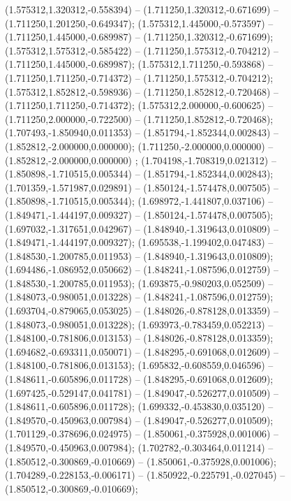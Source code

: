  (1.575312,1.320312,-0.558394) -- (1.711250,1.320312,-0.671699) -- (1.711250,1.201250,-0.649347);
 (1.575312,1.445000,-0.573597) -- (1.711250,1.445000,-0.689987) -- (1.711250,1.320312,-0.671699);
 (1.575312,1.575312,-0.585422) -- (1.711250,1.575312,-0.704212) -- (1.711250,1.445000,-0.689987);
 (1.575312,1.711250,-0.593868) -- (1.711250,1.711250,-0.714372) -- (1.711250,1.575312,-0.704212);
 (1.575312,1.852812,-0.598936) -- (1.711250,1.852812,-0.720468) -- (1.711250,1.711250,-0.714372);
 (1.575312,2.000000,-0.600625) -- (1.711250,2.000000,-0.722500) -- (1.711250,1.852812,-0.720468);
 (1.707493,-1.850940,0.011353) -- (1.851794,-1.852344,0.002843) -- (1.852812,-2.000000,0.000000);
 (1.711250,-2.000000,0.000000) -- (1.852812,-2.000000,0.000000) ;
 (1.704198,-1.708319,0.021312) -- (1.850898,-1.710515,0.005344) -- (1.851794,-1.852344,0.002843);
 (1.701359,-1.571987,0.029891) -- (1.850124,-1.574478,0.007505) -- (1.850898,-1.710515,0.005344);
 (1.698972,-1.441807,0.037106) -- (1.849471,-1.444197,0.009327) -- (1.850124,-1.574478,0.007505);
 (1.697032,-1.317651,0.042967) -- (1.848940,-1.319643,0.010809) -- (1.849471,-1.444197,0.009327);
 (1.695538,-1.199402,0.047483) -- (1.848530,-1.200785,0.011953) -- (1.848940,-1.319643,0.010809);
 (1.694486,-1.086952,0.050662) -- (1.848241,-1.087596,0.012759) -- (1.848530,-1.200785,0.011953);
 (1.693875,-0.980203,0.052509) -- (1.848073,-0.980051,0.013228) -- (1.848241,-1.087596,0.012759);
 (1.693704,-0.879065,0.053025) -- (1.848026,-0.878128,0.013359) -- (1.848073,-0.980051,0.013228);
 (1.693973,-0.783459,0.052213) -- (1.848100,-0.781806,0.013153) -- (1.848026,-0.878128,0.013359);
 (1.694682,-0.693311,0.050071) -- (1.848295,-0.691068,0.012609) -- (1.848100,-0.781806,0.013153);
 (1.695832,-0.608559,0.046596) -- (1.848611,-0.605896,0.011728) -- (1.848295,-0.691068,0.012609);
 (1.697425,-0.529147,0.041781) -- (1.849047,-0.526277,0.010509) -- (1.848611,-0.605896,0.011728);
 (1.699332,-0.453830,0.035120) -- (1.849570,-0.450963,0.007984) -- (1.849047,-0.526277,0.010509);
 (1.701129,-0.378696,0.024975) -- (1.850061,-0.375928,0.001006) -- (1.849570,-0.450963,0.007984);
 (1.702782,-0.303464,0.011214) -- (1.850512,-0.300869,-0.010669) -- (1.850061,-0.375928,0.001006);
 (1.704289,-0.228153,-0.006171) -- (1.850922,-0.225791,-0.027045) -- (1.850512,-0.300869,-0.010669);
